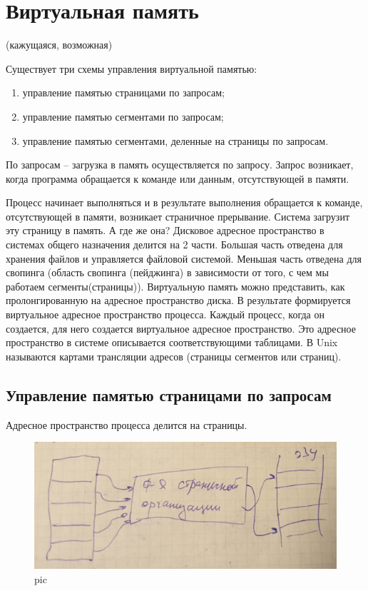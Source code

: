 \section{Виртуальная память}
(кажущаяся, возможная)

Существует три схемы управления виртуальной памятью:
\begin{enumerate}
    \item управление памятью страницами по запросам;
    \item управление памятью сегментами по запросам;
    \item управление памятью сегментами, деленные на страницы по запросам.
\end{enumerate} 

По запросам – загрузка в память осуществляется по запросу. Запрос возникает, когда программа обращается к команде или данным, отсутствующей в памяти. 

Процесс начинает выполняться и в результате выполнения обращается к команде, отсутствующей в памяти, возникает страничное прерывание. Система загрузит эту страницу в память. А где же она? Дисковое адресное пространство в системах общего назначения делится на 2 части. Большая часть отведена для хранения файлов и управляется файловой системой. Меньшая часть отведена для свопинга (область свопинга (пейджинга) в зависимости от того, с чем мы работаем сегменты(страницы)). Виртуальную память можно представить, как пролонгированную на адресное пространство диска. В результате формируется виртуальное адресное пространство процесса. Каждый процесс, когда он создается, для него создается виртуальное адресное пространство. Это адресное пространство в системе описывается соответствующими таблицами. В Unix называются картами трансляции адресов (страницы сегментов или страниц).

\subsection{Управление памятью страницами по запросам}

Адресное пространство процесса делится на страницы.

\begin{figure}[H]
    \centering
    \includegraphics[width=\textwidth]{pic/3.png}
    \caption{pic}
\end{figure}

